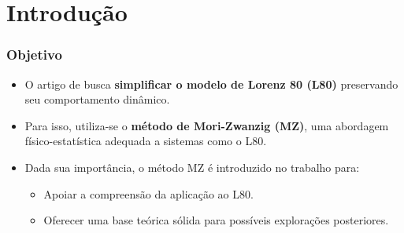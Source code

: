 \section{Introdução} %


\begin{frame}\frametitle{Objetivo}
    \begin{itemize}
        \item O artigo de \cite{Chekroun2021} busca \textbf{simplificar o modelo de Lorenz 80 (L80)} preservando seu comportamento dinâmico.
        
        \item Para isso, utiliza-se o \textbf{método de Mori-Zwanzig (MZ)}, uma abordagem físico-estatística adequada a sistemas como o L80.
        
        \item Dada sua importância, o método MZ é introduzido no trabalho para:
        \begin{itemize}
            \item Apoiar a compreensão da aplicação ao L80.
            \item Oferecer uma base teórica sólida para possíveis explorações posteriores.
        \end{itemize}
    \end{itemize}
\end{frame}


